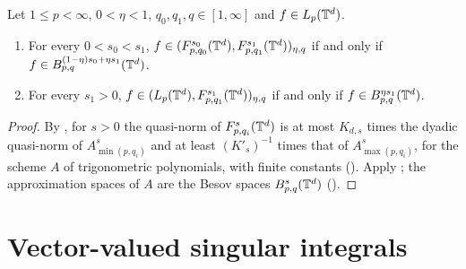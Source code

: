 \begin{theorem}
\label{thm:torus-tl-interpolate}
\leanok
{}
Let $1 \leq p < \infty$, $0 < \eta < 1$, $q_0, q_1, q \in [1, \infty]$ and $f \in L_p(\mathbb{T}^d)$.
\begin{enumerate}
  \item For every $0 < s_0 < s_1$,
    $f \in (F^{s_0}_{p,q_0}(\mathbb{T}^d), F^{s_1}_{p,q_1}(\mathbb{T}^d))_{\eta, q}$ if and only if
    $f \in B^{(1 - \eta) s_0 + \eta s_1}_{p,q}(\mathbb{T}^d)$.
  \item For every $s_1 > 0$, $f \in (L_p(\mathbb{T}^d), F^{s_1}_{p,q_1}(\mathbb{T}^d))_{\eta, q}$ if and only
    if $f \in B^{\eta s_1}_{p,q}(\mathbb{T}^d)$.
\end{enumerate}
\end{theorem}

\begin{proof}
\leanok
{}
By , for $s > 0$ the quasi-norm of $F^{s}_{p,q_i}(\mathbb{T}^d)$ is at
most $K_{d,s}$ times the dyadic quasi-norm of $A^s_{\min(p,q_i)}$ and at least $(K'_s)^{-1}$
times that of $A^s_{\max(p,q_i)}$, for the scheme $A$ of trigonometric polynomials, with finite
constants (). Apply
; the approximation spaces of $A$ are the Besov spaces
$B^{s}_{p,q}(\mathbb{T}^d)$ ().
\end{proof}

\chapter{Vector-valued singular integrals}
\label{ch:singular-integrals}

